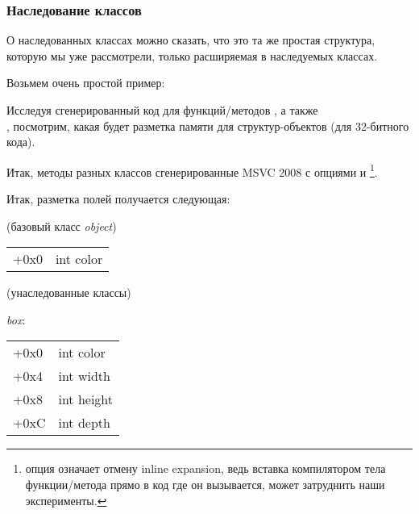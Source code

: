 \subsubsection{Наследование классов}
\label{cpp_inheritance}

О наследованных классах можно сказать, что это та же простая структура, которую мы уже рассмотрели, 
только расширяемая в наследуемых классах.

Возьмем очень простой пример:



Исследуя сгенерированный код для функций/методов , а также \\
,
посмотрим, какая будет разметка памяти для структур-объектов (для 32-битного кода).

Итак, методы  разных классов сгенерированные MSVC 2008 с опциями \Ox и \Obzero
\footnote{опция \Obzero означает отмену inline expansion, 
ведь вставка компилятором тела функции/метода прямо в код где он вызывается, 
может затруднить наши эксперименты.}.







Итак, разметка полей получается следующая:

(базовый класс \emph{object})

\begin{center}
\begin{tabular}{ | l | l | }
\hline
  \tableheader{} \\
\hline
  +0x0 & int color \\
\hline
\end{tabular}
\end{center}

(унаследованные классы)

\emph{box}:

\begin{center}
\begin{tabular}{ | l | l | }
\hline
  \tableheader{} \\
\hline
  +0x0 & int color \\
\hline
  +0x4 & int width \\
\hline
  +0x8 & int height \\
\hline
  +0xC & int depth \\
\hline
\end{tabular}
\end{center}

